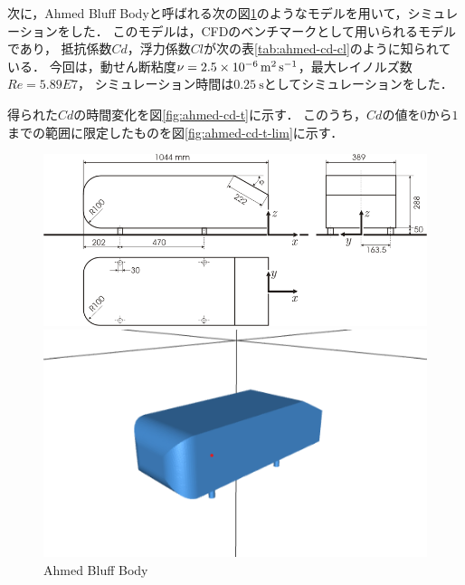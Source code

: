 次に，Ahmed Bluff Bodyと呼ばれる次の図\ref{fig:ahmed-body}のようなモデルを用いて，シミュレーションをした．
このモデルは，CFDのベンチマークとして用いられるモデルであり，
抵抗係数$Cd$，浮力係数$Cl$が次の表\ref{tab:ahmed-cd-cl}のように知られている\cite{ref:ahmed-bluff-body}．
今回は，動せん断粘度$\nu=\SI{2.5E-6}{\square\meter\per\second}$，最大レイノルズ数$Re=5.89E7$，
シミュレーション時間は$\SI{0.25}{\second}$としてシミュレーションをした．

得られた$Cd$の時間変化を図\ref{fig:ahmed-cd-t}に示す．
このうち，$Cd$の値を$0$から$1$までの範囲に限定したものを図\ref{fig:ahmed-cd-t-lim}に示す．

\begin{figure}[ht]
    \begin{minipage}{0.48\linewidth}
        \centering
        \includegraphics[width=\linewidth]{figures/ahmed/ahmed.png}
    \end{minipage}
    \begin{minipage}{0.48\linewidth}
        \centering
        \includegraphics[width=\linewidth]{figures/ahmed/img.png}
    \end{minipage}
    \caption{Ahmed Bluff Body}
    \label{fig:ahmed-body}
\end{figure}

